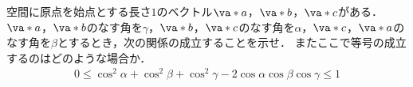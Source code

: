 空間に原点を始点とする長さ$1$のベクトル$\va*{a}$，$\va*{b}$，$\va*{c}$がある．
$\va*{a}$，$\va*{b}$のなす角を$\gamma$，$\va*{b}$，$\va*{c}$のなす角を$\alpha$，$\va*{c}$，$\va*{a}$のなす角を$\beta$とするとき，次の関係の成立することを示せ．
またここで等号の成立するのはどのような場合か．
\begin{align*}
  0\le \cos^2\alpha+\cos^2\beta+\cos^2\gamma-2\cos\alpha \cos\beta \cos\gamma \le 1
\end{align*}
